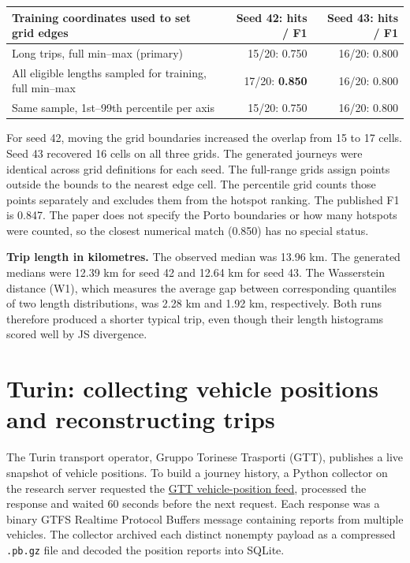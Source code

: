 \documentclass[11pt,a4paper]{article}
\begin{document}
\begin{center}\small
\begin{tabular}{lrr}\toprule
Training coordinates used to set grid edges & Seed 42: hits / F1 & Seed 43: hits / F1\\\midrule
Long trips, full min--max (primary) & 15/20: 0.750 & 16/20: 0.800\\
All eligible lengths sampled for training, full min--max & 17/20: \textbf{0.850} & 16/20: 0.800\\
Same sample, 1st--99th percentile per axis & 15/20: 0.750 & 16/20: 0.800\\\bottomrule
\end{tabular}\end{center}
For seed 42, moving the grid boundaries increased the overlap from 15 to 17 cells. Seed 43 recovered 16 cells on all three grids. The generated journeys were identical across grid definitions for each seed. The full-range grids assign points outside the bounds to the nearest edge cell. The percentile grid counts those points separately and excludes them from the hotspot ranking. The published F1 is 0.847. The paper does not specify the Porto boundaries or how many hotspots were counted, so the closest numerical match (0.850) has no special status.

\textbf{Trip length in kilometres.} The observed median was 13.96 km. The generated medians were 12.39 km for seed 42 and 12.64 km for seed 43. The Wasserstein distance (W1), which measures the average gap between corresponding quantiles of two length distributions, was 2.28 km and 1.92 km, respectively. Both runs therefore produced a shorter typical trip, even though their length histograms scored well by JS divergence.

\newpage
\section*{Turin: collecting vehicle positions and reconstructing trips}
The Turin transport operator, Gruppo Torinese Trasporti (GTT), publishes a live snapshot of vehicle positions. To build a journey history, a Python collector on the research server requested the \href{https://percorsieorari.gtt.to.it/das_gtfsrt/vehicle_position.aspx}{GTT vehicle-position feed}, processed the response and waited 60 seconds before the next request. Each response was a binary GTFS Realtime Protocol Buffers message containing reports from multiple vehicles. The collector archived each distinct nonempty payload as a compressed \texttt{.pb.gz} file and decoded the position reports into SQLite.
\end{document}
